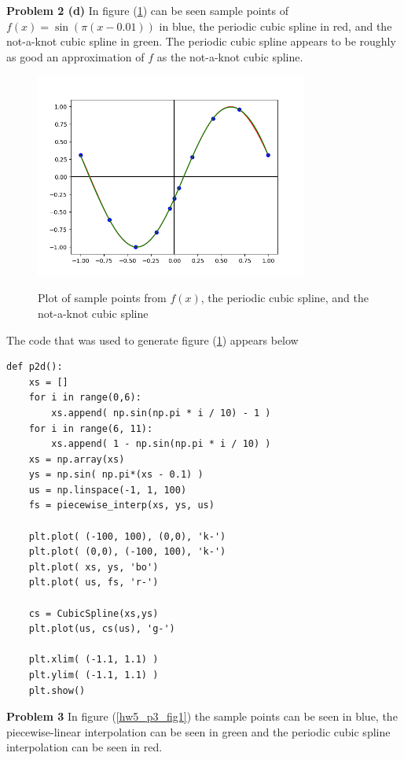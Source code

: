 \documentclass[12pt]{article}
\newcommand{\problem}[1]{\hspace{-4 ex} \large \textbf{Problem #1} }
\begin{document}
\problem{2 (d)} In figure (\ref{hw5_p2_fig1}) can be seen sample points of $f(x) = \sin(\pi(x-0.01))$ in blue, the periodic cubic spline in red, and the not-a-knot cubic spline in green. The periodic cubic spline appears to be roughly as good an approximation of $f$ as the not-a-knot cubic spline.

	\begin{figure}[H]
		\caption{Plot of sample points from $f(x)$, the periodic cubic spline, and the not-a-knot cubic spline}
		\includegraphics[width=0.80\textwidth]{hw5_p2_fig1}
		\label{hw5_p2_fig1}
		\centering
	\end{figure}


	The code that was used to generate figure (\ref{hw5_p2_fig1}) appears below
	\begin{lstlisting}
def p2d():
	xs = []
	for i in range(0,6):
		xs.append( np.sin(np.pi * i / 10) - 1 )
	for i in range(6, 11):
		xs.append( 1 - np.sin(np.pi * i / 10) )
	xs = np.array(xs)
	ys = np.sin( np.pi*(xs - 0.1) )
	us = np.linspace(-1, 1, 100)
	fs = piecewise_interp(xs, ys, us)
	
	plt.plot( (-100, 100), (0,0), 'k-')
	plt.plot( (0,0), (-100, 100), 'k-')
	plt.plot( xs, ys, 'bo')
	plt.plot( us, fs, 'r-')
	
	cs = CubicSpline(xs,ys)
	plt.plot(us, cs(us), 'g-')
	
	plt.xlim( (-1.1, 1.1) )
	plt.ylim( (-1.1, 1.1) )
	plt.show()
	\end{lstlisting}
	
\problem{3} In figure (\ref{hw5_p3_fig1}) the sample points can be seen in blue, the piecewise-linear interpolation can be seen in green and the periodic cubic spline interpolation can be seen in red.
	
\end{document}
